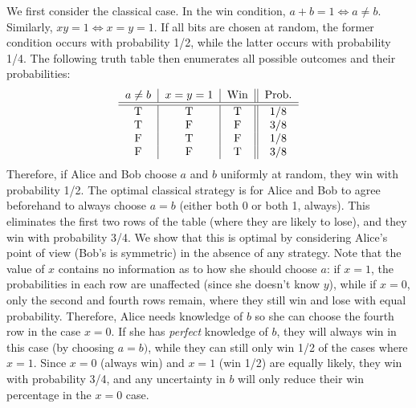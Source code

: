\documentclass[12pt]{article}
\begin{document}
\begin{appendices}
We first consider the classical case. In the win condition, $a + b = 1 \Leftrightarrow a \neq b$. Similarly, $xy = 1 \Leftrightarrow x = y = 1$. If all bits are chosen at random, the former condition occurs with probability 1/2, while the latter occurs with probability 1/4. The following truth table then enumerates all possible outcomes and their probabilities:
\begin{equation}
\begin{tabular}{c|c|c||c}
    $a \neq b$ & $x = y = 1$ & Win & Prob. \\
    \hline\hline
    T & T & T & 1/8 \\
    T & F & F & 3/8 \\
    F & T & F & 1/8 \\
    F & F & T & 3/8
\end{tabular}
\label{eq:chsh-truth-table}
\end{equation}
Therefore, if Alice and Bob choose $a$ and $b$ uniformly at random, they win with probability 1/2. The optimal classical strategy is for Alice and Bob to agree beforehand to always choose $a=b$ (either both 0 or both 1, always). This eliminates the first two rows of the table (where they are likely to lose), and they win with probability 3/4. We show that this is optimal by considering Alice's point of view (Bob's is symmetric) in the absence of any strategy. Note that the value of $x$ contains no information as to how she should choose $a$: if $x=1$, the probabilities in each row are unaffected (since she doesn't know $y$), while if $x=0$, only the second and fourth rows remain, where they still win and lose with equal probability. Therefore, Alice needs knowledge of $b$ so she can choose the fourth row in the case $x=0$. If she has \emph{perfect} knowledge of $b$, they will always win in this case (by choosing $a=b)$, while they can still only win 1/2 of the cases where $x=1$. Since $x=0$ (always win) and $x=1$ (win 1/2) are equally likely, they win with probability 3/4, and any uncertainty in $b$ will only reduce their win percentage in the $x=0$ case.


\end{appendices}
\end{document}
